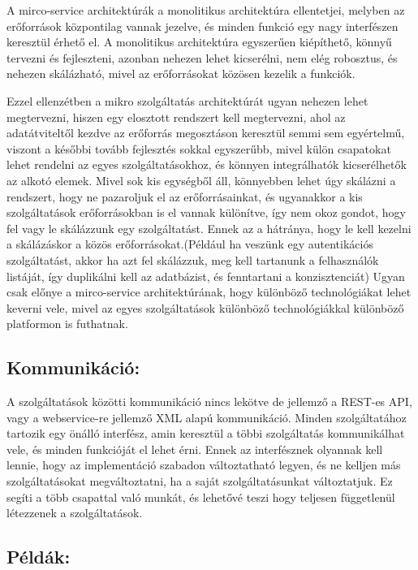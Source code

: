 \documentclass[11pt,magyar,a4paper,oneside,]{report}
\begin{document}
A mirco-service architektúrák a monolitikus architektúra ellentetjei,
melyben az erőforrások központilag vannak jezelve, és minden funkció egy
nagy interfészen keresztül érhető el. A monolitikus architektúra
egyszerűen kiépíthető, könnyű tervezni és fejleszteni, azonban nehezen
lehet kicserélni, nem elég robosztus, és nehezen skálázható, mivel az
erőforrásokat közösen kezelik a funkciók.

Ezzel ellenzétben a mikro szolgáltatás architektúrát ugyan nehezen lehet
megtervezni, hiszen egy elosztott rendszert kell megtervezni, ahol az
adatátviteltől kezdve az erőforrás megosztáson keresztül semmi sem
egyértelmű, viszont a későbbi tovább fejlesztés sokkal egyszerűbb, mivel
külön csapatokat lehet rendelni az egyes szolgáltatásokhoz, és könnyen
integrálhatók kicserélhetők az alkotó elemek. Mivel sok kis egységből
áll, könnyebben lehet úgy skálázni a rendszert, hogy ne pazaroljuk el az
erőforrásainkat, és ugyanakkor a kis szolgáltatások erőforrásokban is el
vannak különítve, így nem okoz gondot, hogy fel vagy le skálázzunk egy
szolgáltatást. Ennek az a hátránya, hogy le kell kezelni a skálázáskor a
közös erőforrásokat.(Például ha veszünk egy autentikációs szolgáltatást,
akkor ha azt fel skálázzuk, meg kell tartanunk a felhasználók listáját,
így duplikálni kell az adatbázist, és fenntartani a konzisztenciát)
Ugyan csak előnye a mirco-service architektúrának, hogy különböző
technológiákat lehet keverni vele, mivel az egyes szolgáltatások
különböző technológiákkal különböző platformon is futhatnak.

\subsection{Kommunikáció:}\label{kommunikuxe1ciuxf3}

A szolgáltatások közötti kommunikáció nincs lekötve de jellemző a
REST-es API, vagy a webservice-re jellemző XML alapú kommunikáció.
Minden szolgáltatához tartozik egy önálló interfész, amin keresztül a
többi szolgáltatás kommunikálhat vele, és minden funkcióját el lehet
érni. Ennek az interfésznek olyannak kell lennie, hogy az implementáció
szabadon változtatható legyen, és ne kelljen más szolgáltatásokat
megváltoztatni, ha a saját szolgáltatásunkat változtatjuk. Ez segíti a
több csapattal való munkát, és lehetővé teszi hogy teljesen függetlenül
létezzenek a szolgáltatások.

\subsection{Példák:}\label{puxe9lduxe1k}
\end{document}
